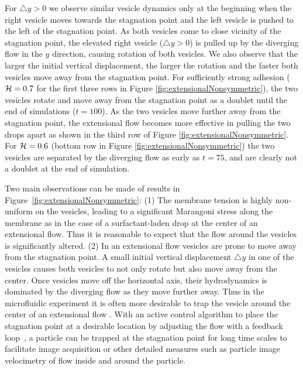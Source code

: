 \documentclass[prf,superscriptaddress,showkeys,longbibliography]{revtex4-1}
\begin{document}
For $\triangle y>0$ we observe similar vesicle dynamics only at the beginning 
when the right vesicle moves towards the stagnation point and the left vesicle is pushed to the left of the stagnation point. 
As both vesicles come to close vicinity of the stagnation point, the elevated right vesicle ($\triangle y >0$) is pulled up by the diverging flow in the $y$ direction,
causing rotation of both vesicles. 
We also observe that the larger the initial vertical displacement, the larger the rotation and the faster both vesicles move
away from the stagnation point.
%
For sufficiently strong adhesion (${\cal H}=0.7$ for the first three rows in Figure \ref{fig:extensionalNonsymmetric}),
 the two vesicles rotate and move away from the stagnation point as a doublet until the end of simulations ($t=100$).
As the two vesicles move further away from the stagnation point, the extensional flow becomes more effective in pulling the two drops apart
as shown in the third row of Figure \ref{fig:extensionalNonsymmetric}.
For ${\cal H}=0.6$ (bottom row in Figure \ref{fig:extensionalNonsymmetric})  
the two vesicles are separated by the diverging flow as early as $t=75$, and are clearly not a doublet at the end of simulation.


Two main observations can be made of results in Figure~\ref{fig:extensionalNonsymmetric}:
(1) The membrane tension is highly non-uniform on the vesicles, leading to a significant Marangoni stress along the membrane as in the case of a surfactant-laden drop
at the center of an extensional flow. Thus it is reasonable to expect that the flow around the vesicles is significantly altered.
(2) In an extensional flow vesicles are prone to move away from the stagnation point.
A small initial vertical displacement $\triangle y$ in one  of the vesicles causes both vesicles to not only rotate but also move away from the
center. Once vesicles move off the horizontal axis, their hydrodynamics is dominated by the diverging flow as they move further away.
Thus in the microfluidic experiment it is often more desirable to trap the vesicle around the center of an extensional flow \cite{Spjut2010_MSThesis_Chapter3}.
%
With an active
control algorithm to place the stagnation point at a desirable location
by adjusting the flow with a feedback
loop~\cite{BentleyLeal1986_JFMa,Johnson-Chavarria2011_EMJ}, a particle can be trapped at the
stagnation point for long time scales to facilitate image acquisition or
other detailed measures such as particle image velocimetry of flow
inside and around the particle.  
\end{document}
